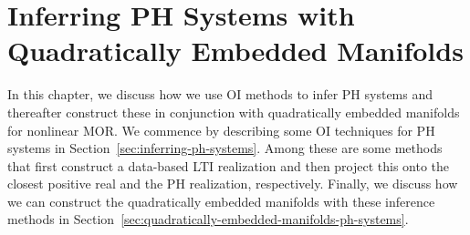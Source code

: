 \chapter[Inferring \texorpdfstring{\ac{PH} Systems with Quadratically Embedded Manifolds}{PH}]{%
    Inferring \texorpdfstring{\acl{PH}}{Port-Hamiltonian} Systems with \\
    Quadratically Embedded Manifolds
}\label{chap:inferring-models}

In this chapter, we discuss how we use \ac{OI} methods to infer \ac{PH} systems and thereafter construct these in conjunction with quadratically embedded manifolds for nonlinear \ac{MOR}.
We commence by describing some \ac{OI} techniques for \ac{PH} systems in Section~\ref{sec:inferring-ph-systems}.
Among these are some methods that first construct a data-based \ac{LTI} realization and then project this onto the closest positive real and the \ac{PH} realization, respectively.
Finally, we discuss how we can construct the quadratically embedded manifolds with these inference methods in Section~\ref{sec:quadratically-embedded-manifolds-ph-systems}.



